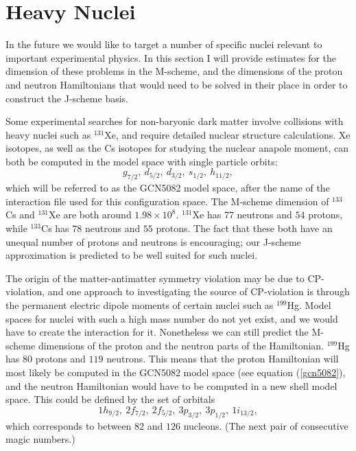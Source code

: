 \section{Heavy Nuclei}
In the future we would like to target a number of specific nuclei relevant to 
important experimental physics. In this section I will provide estimates for the 
dimension of these problems in the M-scheme, and the dimensions of the proton
and neutron Hamiltonians that would need to be solved in their place in order
to construct the J-scheme basis.

Some experimental searches for non-baryonic dark matter involve collisions
with heavy nuclei such as $^{131}$Xe, and require detailed nuclear structure calculations\cite{Bednyakov}.
Xe isotopes, as well as the Cs isotopes for studying the nuclear anapole moment,
can both be computed in the model space with single particle orbits:
\begin{equation}\label{gcn5082}
    g_{7/2},\ d_{5/2},\ d_{3/2},\ s_{1/2},\ h_{11/2},
\end{equation}
which will be referred to as the GCN5082 model space, after the name of the interaction
file used for this configuration space.
The M-scheme dimension of $^{133}$Cs and $^{131}$Xe are both around $1.98 \times 10^8$.
$^{131}$Xe has $77$ neutrons and $54$ protons, while $^{133}$Cs has $78$ neutrons
and $55$ protons. The fact that these both have an unequal number of protons 
and neutrons is encouraging; our J-scheme approximation is predicted to be 
well suited for such nuclei.


The origin of the matter-antimatter symmetry 
violation may be due to CP-violation\cite{Sakhorav}, and one approach to investigating the 
source of CP-violation is through the permanent electric dipole moments of certain
nuclei such as $^{199}$Hg\cite{Willmann}. Model spaces for nuclei with such a high
mass number do not yet exist, and we would have to create the interaction
for it. Nonetheless we can still predict the M-scheme dimensions of the proton and
the neutron parts of the Hamiltonian. $^{199}$Hg has $80$ protons and $119$ neutrons.
This means that the proton Hamiltonian will most likely be computed in the
GCN5082 model space (see equation (\ref{gcn5082}), and the neutron Hamiltonian
would have to be computed in a new shell model space. This could be defined
by the set of orbitals
\begin{equation}\label{newspo}
   1h_{9/2},\ 2f_{7/2},\ 2f_{5/2},\ 3p_{3/2},\ 3p_{1/2},\ 1i_{13/2},
\end{equation}
which corresponds to between $82$ and $126$ nucleons. (The next pair of consecutive magic 
numbers.) 

